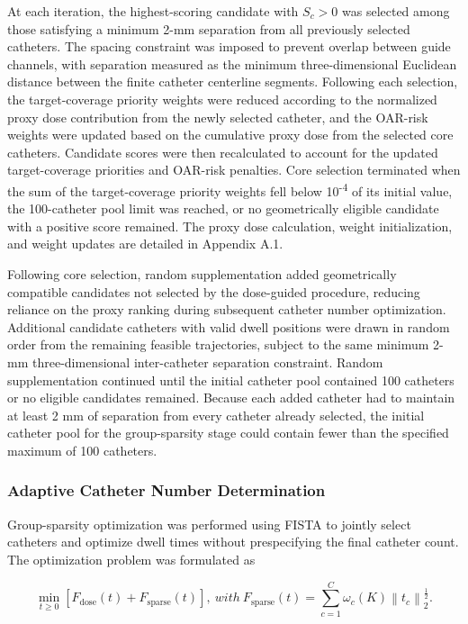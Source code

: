 \documentclass[12pt,twoside,letterpaper]{article}
\begin{document}
At each iteration, the highest-scoring candidate with $S_{c} > 0$ was selected among those satisfying a minimum 2-mm separation from all previously selected catheters. The spacing constraint was imposed to prevent overlap between guide channels, with separation measured as the minimum three-dimensional Euclidean distance between the finite catheter centerline segments. Following each selection, the target-coverage priority weights were reduced according to the normalized proxy dose contribution from the newly selected catheter, and the OAR-risk weights were updated based on the cumulative proxy dose from the selected core catheters. Candidate scores were then recalculated to account for the updated target-coverage priorities and OAR-risk penalties. Core selection terminated when the sum of the target-coverage priority weights fell below 10\textsuperscript{-4} of its initial value, the 100-catheter pool limit was reached, or no geometrically eligible candidate with a positive score remained. The proxy dose calculation, weight initialization, and weight updates are detailed in Appendix A.1.

Following core selection, random supplementation added geometrically compatible candidates not selected by the dose-guided procedure, reducing reliance on the proxy ranking during subsequent catheter number optimization. Additional candidate catheters with valid dwell positions were drawn in random order from the remaining feasible trajectories, subject to the same minimum 2-mm three-dimensional inter-catheter separation constraint. Random supplementation continued until the initial catheter pool contained 100 catheters or no eligible candidates remained. Because each added catheter had to maintain at least 2 mm of separation from every catheter already selected, the initial catheter pool for the group-sparsity stage could contain fewer than the specified maximum of 100 catheters.

\subsubsection{Adaptive Catheter Number Determination}\label{sec:2-2-2}

Group-sparsity optimization was performed using FISTA\cite{ref70,ref71} to jointly select catheters and optimize dwell times without prespecifying the final catheter count. The optimization problem was formulated as

\begin{equation}\label{eq:4}
\min_{t \geq 0}\left\lbrack F_{\text{dose}}\left( t \right) + F_{\text{sparse}}\left( t \right) \right\rbrack,\ with\ F_{\text{sparse}}\left( t \right) = \sum_{c = 1}^{C}{\omega_{c}(K)\left\| t_{c} \right\|_{2}^{\frac{1}{2}}}.
\end{equation}
\end{document}
